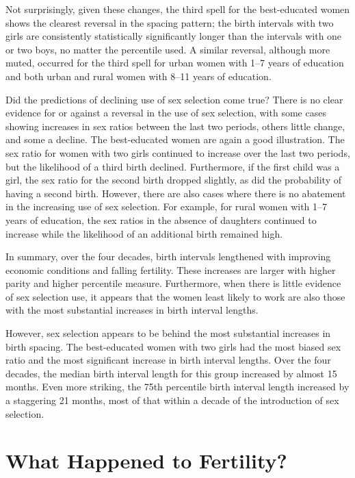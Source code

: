 \documentclass[12pt,letterpaper]{article}
\begin{document}
Not surprisingly, given these changes, the third spell for the best-educated women shows
the clearest reversal in the spacing pattern; the birth intervals with two girls are
consistently statistically significantly longer than the intervals with one or two boys, 
no matter the percentile used.
A similar reversal, although more muted, occurred for the third spell for urban women 
with 1--7 years of education and both urban and rural women with 8--11 years of 
education.

Did the predictions of declining use of sex selection come true? 
There is no clear evidence for or against a reversal in the use of sex selection, with 
some cases showing increases in sex ratios between the last two periods, others little 
change, and some a decline. 
The best-educated women are again a good illustration. 
The sex ratio for women with two girls continued to increase over the last two periods, 
but the likelihood of a third birth declined. 
Furthermore, if the first child was a girl, the sex ratio for the second birth dropped 
slightly, as did the probability of having a second birth. 
However, there are also cases where there is no abatement in the increasing use of sex 
selection. 
For example, for rural women with 1--7 years of education, the sex ratios in the absence 
of daughters continued to increase while the likelihood of an additional birth remained 
high.

In summary, over the four decades, birth intervals lengthened with improving economic 
conditions and falling fertility. 
These increases are larger with higher parity and higher percentile measure. 
Furthermore, when there is little evidence of sex selection use, it appears that the women 
least likely to work are also those with the most substantial increases in birth interval 
lengths.

However, sex selection appears to be behind the most substantial increases in birth spacing. 
The best-educated women with two girls had the most biased sex ratio and the most 
significant increase in birth interval lengths. 
Over the four decades, the median birth interval length for this group increased by almost
15 months. 
Even more striking, the 75th percentile birth interval length increased by a staggering 21
months, most of that within a decade of the introduction of sex selection.

\section{What Happened to Fertility?\label{sec:fertility}}
\end{document}
